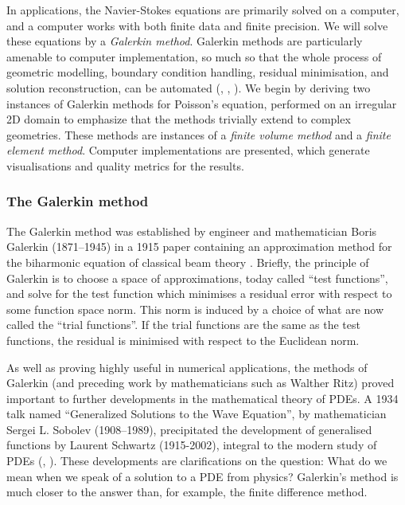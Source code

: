 In applications, the Navier-Stokes equations are primarily
solved on a computer, and a computer works with both finite data and finite precision. We will solve these equations by a \textit{Galerkin method}.
Galerkin methods
are particularly amenable to computer implementation, so much so that the whole process of geometric modelling, boundary condition handling,
residual minimisation, and solution reconstruction, can be automated (\cite{firedrake}, \cite{fenics_book}, \cite{DOLFIN}). We begin by
deriving two instances of Galerkin methods for Poisson's equation, performed on an irregular 2D domain to emphasize that the methods trivially extend
to complex geometries.
These methods are instances of a \textit{finite volume method} and a \textit{finite element method}.
Computer implementations are presented, which generate visualisations and quality metrics for the results.



\subsubsection{The Galerkin method}
The Galerkin method was established by engineer and mathematician Boris Galerkin (1871--1945) in a 1915 paper containing
an approximation method for the biharmonic equation of classical beam theory \cite{boris_galerkin}. Briefly, the principle of Galerkin is to
choose a space of approximations, today called ``test functions'', and solve for the test function which minimises a residual error with respect
to some function space norm. This norm is induced by a choice of what are now called the ``trial functions''. If the trial functions are the same as the test functions,
the residual is minimised with respect to the Euclidean norm.

As well as proving highly useful
in numerical applications, the methods of Galerkin (and preceding work by mathematicians such as Walther Ritz) proved important to further developments
in the mathematical theory of PDEs. A 1934 talk named ``Generalized Solutions to the Wave Equation'', by mathematician Sergei L. Sobolev (1908--1989),
precipitated the development
of generalised functions by Laurent Schwartz (1915-2002), integral to the modern study of PDEs
(\cite{sobolev_web_page}, \cite{one_hundred_years_galerkin}).
These developments are clarifications on the question: What do we mean when we speak of a solution to a PDE from physics? Galerkin's method
is much closer to the answer than, for example, the finite difference method.


